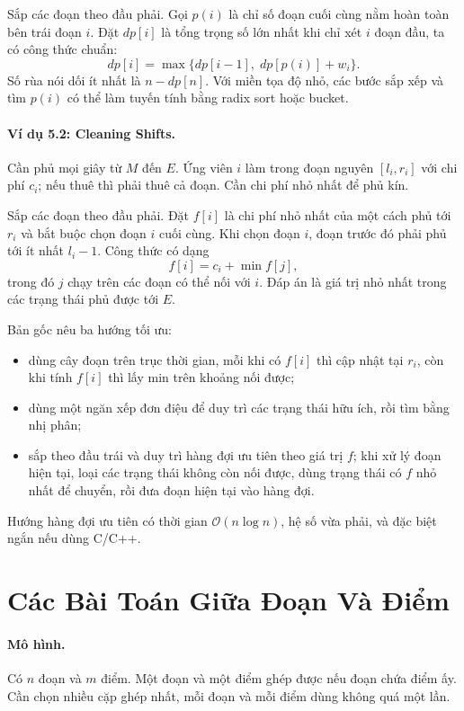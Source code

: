 \documentclass[11pt]{article}
\newcommand{\Oh}{\mathcal{O}}
\begin{document}
Sắp các đoạn theo đầu phải. Gọi \(p(i)\) là chỉ số đoạn cuối cùng nằm hoàn
toàn bên trái đoạn \(i\). Đặt \(dp[i]\) là tổng trọng số lớn nhất khi chỉ xét
\(i\) đoạn đầu, ta có công thức chuẩn:
\[
  dp[i]=\max\{dp[i-1],\; dp[p(i)]+w_i\}.
\]
Số rùa nói dối ít nhất là \(n-dp[n]\). Với miền tọa độ nhỏ, các bước sắp xếp
và tìm \(p(i)\) có thể làm tuyến tính bằng radix sort hoặc bucket.

\paragraph{Ví dụ 5.2: Cleaning Shifts.}
Cần phủ mọi giây từ \(M\) đến \(E\). Ứng viên \(i\) làm trong đoạn nguyên
\([l_i,r_i]\) với chi phí \(c_i\); nếu thuê thì phải thuê cả đoạn. Cần chi phí
nhỏ nhất để phủ kín.

Sắp các đoạn theo đầu phải. Đặt \(f[i]\) là chi phí nhỏ nhất của một cách phủ
tới \(r_i\) và bắt buộc chọn đoạn \(i\) cuối cùng. Khi chọn đoạn \(i\), đoạn
trước đó phải phủ tới ít nhất \(l_i-1\). Công thức có dạng
\[
  f[i]=c_i+\min f[j],
\]
trong đó \(j\) chạy trên các đoạn có thể nối với \(i\). Đáp án là giá trị nhỏ
nhất trong các trạng thái phủ được tới \(E\).

Bản gốc nêu ba hướng tối ưu:
\begin{itemize}
  \item dùng cây đoạn trên trục thời gian, mỗi khi có \(f[i]\) thì cập nhật
  tại \(r_i\), còn khi tính \(f[i]\) thì lấy min trên khoảng nối được;
  \item dùng một ngăn xếp đơn điệu để duy trì các trạng thái hữu ích, rồi tìm
  bằng nhị phân;
  \item sắp theo đầu trái và duy trì hàng đợi ưu tiên theo giá trị \(f\); khi
  xử lý đoạn hiện tại, loại các trạng thái không còn nối được, dùng trạng thái
  có \(f\) nhỏ nhất để chuyển, rồi đưa đoạn hiện tại vào hàng đợi.
\end{itemize}
Hướng hàng đợi ưu tiên có thời gian \(\Oh(n\log n)\), hệ số vừa phải, và đặc
biệt ngắn nếu dùng C/C++.

\section{Các Bài Toán Giữa Đoạn Và Điểm}

\paragraph{Mô hình.}
Có \(n\) đoạn và \(m\) điểm. Một đoạn và một điểm ghép được nếu đoạn chứa điểm
ấy. Cần chọn nhiều cặp ghép nhất, mỗi đoạn và mỗi điểm dùng không quá một lần.
\end{document}
